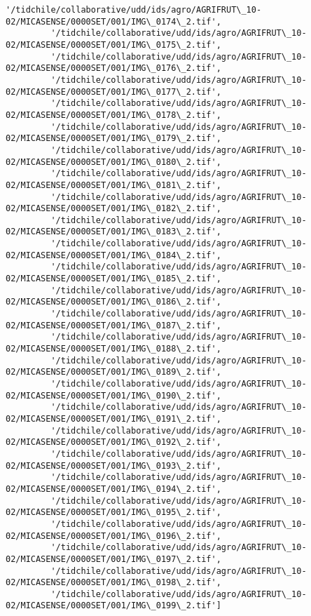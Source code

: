 \documentclass[11pt]{article}
\begin{document}
\begin{Verbatim}[commandchars=\\\{\}]
         '/tidchile/collaborative/udd/ids/agro/AGRIFRUT\_10-02/MICASENSE/0000SET/001/IMG\_0174\_2.tif',
         '/tidchile/collaborative/udd/ids/agro/AGRIFRUT\_10-02/MICASENSE/0000SET/001/IMG\_0175\_2.tif',
         '/tidchile/collaborative/udd/ids/agro/AGRIFRUT\_10-02/MICASENSE/0000SET/001/IMG\_0176\_2.tif',
         '/tidchile/collaborative/udd/ids/agro/AGRIFRUT\_10-02/MICASENSE/0000SET/001/IMG\_0177\_2.tif',
         '/tidchile/collaborative/udd/ids/agro/AGRIFRUT\_10-02/MICASENSE/0000SET/001/IMG\_0178\_2.tif',
         '/tidchile/collaborative/udd/ids/agro/AGRIFRUT\_10-02/MICASENSE/0000SET/001/IMG\_0179\_2.tif',
         '/tidchile/collaborative/udd/ids/agro/AGRIFRUT\_10-02/MICASENSE/0000SET/001/IMG\_0180\_2.tif',
         '/tidchile/collaborative/udd/ids/agro/AGRIFRUT\_10-02/MICASENSE/0000SET/001/IMG\_0181\_2.tif',
         '/tidchile/collaborative/udd/ids/agro/AGRIFRUT\_10-02/MICASENSE/0000SET/001/IMG\_0182\_2.tif',
         '/tidchile/collaborative/udd/ids/agro/AGRIFRUT\_10-02/MICASENSE/0000SET/001/IMG\_0183\_2.tif',
         '/tidchile/collaborative/udd/ids/agro/AGRIFRUT\_10-02/MICASENSE/0000SET/001/IMG\_0184\_2.tif',
         '/tidchile/collaborative/udd/ids/agro/AGRIFRUT\_10-02/MICASENSE/0000SET/001/IMG\_0185\_2.tif',
         '/tidchile/collaborative/udd/ids/agro/AGRIFRUT\_10-02/MICASENSE/0000SET/001/IMG\_0186\_2.tif',
         '/tidchile/collaborative/udd/ids/agro/AGRIFRUT\_10-02/MICASENSE/0000SET/001/IMG\_0187\_2.tif',
         '/tidchile/collaborative/udd/ids/agro/AGRIFRUT\_10-02/MICASENSE/0000SET/001/IMG\_0188\_2.tif',
         '/tidchile/collaborative/udd/ids/agro/AGRIFRUT\_10-02/MICASENSE/0000SET/001/IMG\_0189\_2.tif',
         '/tidchile/collaborative/udd/ids/agro/AGRIFRUT\_10-02/MICASENSE/0000SET/001/IMG\_0190\_2.tif',
         '/tidchile/collaborative/udd/ids/agro/AGRIFRUT\_10-02/MICASENSE/0000SET/001/IMG\_0191\_2.tif',
         '/tidchile/collaborative/udd/ids/agro/AGRIFRUT\_10-02/MICASENSE/0000SET/001/IMG\_0192\_2.tif',
         '/tidchile/collaborative/udd/ids/agro/AGRIFRUT\_10-02/MICASENSE/0000SET/001/IMG\_0193\_2.tif',
         '/tidchile/collaborative/udd/ids/agro/AGRIFRUT\_10-02/MICASENSE/0000SET/001/IMG\_0194\_2.tif',
         '/tidchile/collaborative/udd/ids/agro/AGRIFRUT\_10-02/MICASENSE/0000SET/001/IMG\_0195\_2.tif',
         '/tidchile/collaborative/udd/ids/agro/AGRIFRUT\_10-02/MICASENSE/0000SET/001/IMG\_0196\_2.tif',
         '/tidchile/collaborative/udd/ids/agro/AGRIFRUT\_10-02/MICASENSE/0000SET/001/IMG\_0197\_2.tif',
         '/tidchile/collaborative/udd/ids/agro/AGRIFRUT\_10-02/MICASENSE/0000SET/001/IMG\_0198\_2.tif',
         '/tidchile/collaborative/udd/ids/agro/AGRIFRUT\_10-02/MICASENSE/0000SET/001/IMG\_0199\_2.tif']
\end{Verbatim}
            
\end{document}
